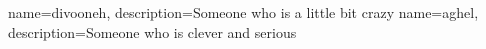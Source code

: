 {
        name=divooneh,
        description={Someone who is a little bit crazy}
}
{
        name=aghel,
        description={Someone who is clever and serious}
}
\printglossary[type=\acronymtype]
\printglossary
\newpage
